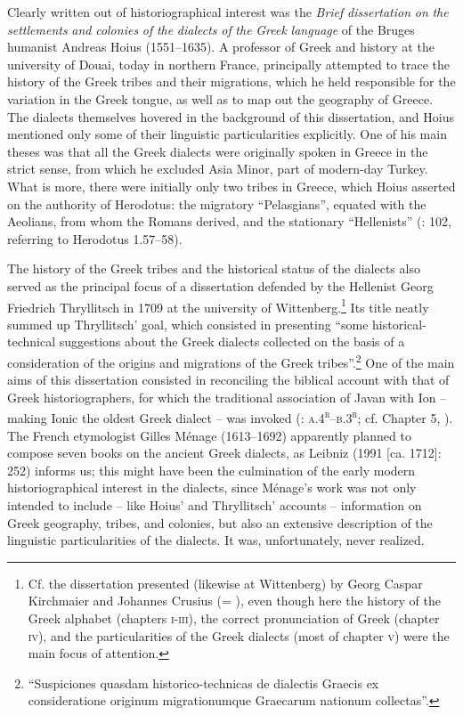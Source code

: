 \documentclass[output=paper]{langsci/langscibook}
\begin{document}
Clearly written out of historiographical interest was the \textit{Brief} \textit{dissertation} \textit{on} \textit{the} \textit{settlements} \textit{and} \textit{colonies} \textit{of} \textit{the} \textit{dialects} \textit{of} \textit{the} \textit{Greek} \textit{language}  of the Bruges humanist Andreas Hoius (1551–1635). A professor of Greek and history at the university of Douai, today in northern France, \citet[95]{Hoius1620} principally attempted to trace the history of the Greek tribes and their migrations, which he held responsible for the variation in the Greek tongue, as well as to map out the geography of Greece. The dialects themselves hovered in the background of this dissertation, and Hoius mentioned only some of their linguistic particularities explicitly. One of his main theses was that all the Greek dialects were originally spoken in Greece in the strict sense, from which he excluded Asia Minor, part of modern-day Turkey.\textsuperscript{} What is more, there were initially only two tribes in Greece, which Hoius asserted on the authority of Herodotus: the migratory “Pelasgians”, equated with the Aeolians, from whom the Romans derived, and the stationary “Hellenists” (\citealt{Hoius1620}: 102, referring to Herodotus 1.57–58).

The history of the Greek tribes and the historical status of the dialects also served as the principal focus of a dissertation defended by the Hellenist Georg Friedrich Thryllitsch in 1709 at the university of Wittenberg.\footnote{Cf. the dissertation presented (likewise at Wittenberg) by Georg Caspar Kirchmaier and Johannes Crusius (= \citealt{KirchmaierCrusius1684}), even though here the history of the Greek alphabet (chapters \textsc{i}{}-\textsc{iii}), the correct pronunciation of Greek (chapter \textsc{iv}), and the particularities of the Greek dialects (most of chapter \textsc{v}) were the main focus of attention.} Its title neatly summed up Thryllitsch’ goal, which consisted in presenting “some historical-technical suggestions about the Greek dialects collected on the basis of a consideration of the origins and migrations of the Greek tribes”.\footnote{“Suspiciones quasdam historico-technicas de dialectis Graecis ex consideratione originum migrationumque Graecarum nationum collectas”.} One of the main aims of this dissertation consisted in reconciling the biblical account with that of Greek historiographers, for which the traditional association of Javan with Ion – making Ionic the oldest Greek dialect – was invoked (\citealt{Thryllitsch1709}: \textsc{a.4}\textsc{\textsuperscript{r}}\textsc{–b.3}\textsc{\textsuperscript{r}}; cf. Chapter 5, ). The French etymologist Gilles Ménage (1613–1692) apparently planned to compose seven books on the ancient Greek dialects, as Leibniz (1991 [ca. 1712]: 252) informs us; this might have been the culmination of the early modern historiographical interest in the dialects, since Ménage’s work was not only intended to include – like Hoius’ and Thryllitsch’ accounts – information on Greek geography, tribes, and colonies, but also an extensive description of the linguistic particularities of the dialects. It was, unfortunately, never realized.
\end{document}
